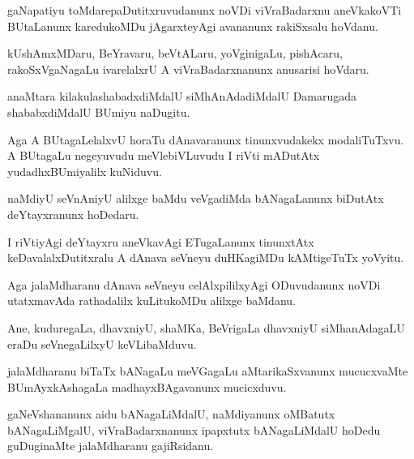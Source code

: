 \documentclass{article}
\begin{document}
\begin{mn}%
gaNapatiyu toMdarepaDutitxruvudanunx noVDi viVraBadarxnu aneVkakoVTi BUtaLanunx karedukoMDu 
jAgarxteyAgi avananunx rakiSxsalu hoVdanu.
\end{mn}

\begin{mn}%
kUshAmxMDaru, BeYravaru, beVtALaru, yoVginigaLu, pishAcaru, rakoSxVgaNagaLu ivarelalxrU A 
viVraBadarxnanunx anusarisi hoVdaru.
\end{mn}

\begin{mn}%
anaMtara  kilakulashabadxdiMdalU siMhAnAdadiMdalU Damarugada shababxdiMdalU BUmiyu naDugitu.
\end{mn}

\begin{mn}%
Aga A BUtagaLelalxvU horaTu dAnavaranunx tinunxvudakekx modaliTuTxvu. A BUtagaLu negeyuvudu 
meVlebiVLuvudu I riVti mADutAtx yudadhxBUmiyalilx kuNiduvu.
\end{mn}

\begin{mn}%
naMdiyU seVnAniyU alilxge baMdu veVgadiMda bANagaLanunx biDutAtx deYtayxranunx hoDedaru.
\end{mn}

\begin{mn}%
I riVtiyAgi deYtayxru aneVkavAgi ETugaLanunx tinunxtAtx keDavalalxDutitxralu A dAnava seVneyu 
duHKagiMDu kAMtigeTuTx yoVyitu.
\end{mn}

\begin{mn}%
Aga jalaMdharanu dAnava seVneyu celAlxpililxyAgi ODuvudanunx noVDi utatxmavAda rathadalilx 
kuLitukoMDu alilxge baMdanu.
\end{mn}

\begin{mn}%
Ane, kuduregaLa, dhavxniyU, shaMKa, BeVrigaLa dhavxniyU siMhanAdagaLU eraDu seVnegaLilxyU 
keVLibaMduvu.
\end{mn}

\begin{mn}%
jalaMdharanu biTaTx bANagaLu meVGagaLu aMtarikaSxvanunx mucucxvaMte BUmAyxkAshagaLa 
madhayxBAgavanunx mucicxduvu.
\end{mn}

\begin{mn}%
gaNeVshananunx aidu bANagaLiMdalU, naMdiyanunx oMBatutx bANagaLiMgalU, viVraBadarxnanunx ipapxtutx 
bANagaLiMdalU hoDedu guDuginaMte jalaMdharanu gajiRsidanu.
\end{mn}
\end{document}
